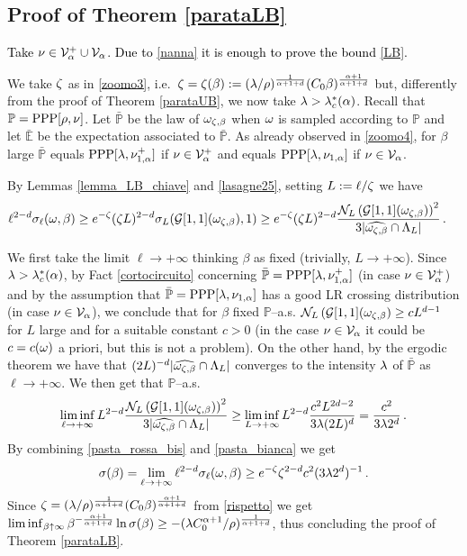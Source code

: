 \documentclass[12pt,a4paper,reqno]{amsart}
\newcommand{\cG}{\ensuremath{\mathcal G}}
\newcommand{\cN}{\ensuremath{\mathcal N}}
\newcommand{\cV}{\ensuremath{\mathcal V}}
\newcommand{\bbE}{{\ensuremath{\mathbb E}} }
\newcommand{\bbP}{{\ensuremath{\mathbb P}} }
\let\a=\alpha \let\b=\beta   \let\d=\delta  \let\e=\varepsilon
\newcommand{\rosso}{\textcolor{black}} %
\newcommand{\be}{\begin{equation}}
\newcommand{\en}{\end{equation}}
\newcommand{\cv}{\rosso{\cV_\alpha}}
\newcommand{\cvp}{\rosso{\cV^+_\alpha}}
\begin{document}
\subsection{Proof of Theorem \ref{parataLB}} \rosso{Take $\nu \in \cvp\cup \cv$.
 Due to \eqref{nanna} it is enough to prove the bound \eqref{LB}.}
 
We take $\zeta$ as in \eqref{zoomo3}, i.e.~$\z=\z(\b):=(\l /\rho)^{\frac{1}{\a+1+d}}(C_0 \b) ^{\frac{\a+1}{\a+1+d}}$ but, differently from the proof of Theorem \ref{parataUB}, we now take $\l>\l_c^*(\a)$. Recall that $\bbP={\rm PPP}[\rho, \nu]$.
 Let $\bar\bbP$ be   the law of $\o_{\z,\b}$ when $\omega$ is sampled according to $\bbP$ and let  $\bar \bbE$ be the expectation associated to $\bar \bbP$.
As already observed in \eqref{zoomo4},  for $\b$ large
  $\bar \bbP$ equals
$ {\rm PPP}[\l   ,\nu_{1,\a}^+]  $ if $ \nu\in \cvp$ and equals ${\rm PPP}[\l   ,\nu_{1,\a}]  $ if $ \nu \in \cv$.


 By Lemmas  \ref{lemma_LB_chiave}  and  \ref{lasagne25}, setting  $ L:= \ell/\zeta$ we have 
 \be\label{pasta_rossa_bis}
 \begin{split}
\ell^{2-d}\s_\ell(\o, \b)& \geq  e^{-\z } (\z L) ^{2-d}  \s_{L} ( \cG[1,1](\o_{\z,\b}  ),1)
\geq  e^{-\z }(\z L) ^{2-d} \frac{\cN_L\left( \cG[1,1](\o_{\z ,\b}  )\right)^2}{ 3 | \widehat{\o_{\z  ,\b} } \cap \L_L|}\,.
\end{split}
\en



We first take the limit $\ell \to +\infty$ thinking $\b$ as fixed (trivially, $L\to +\infty$).  Since $\l>\l_c^*(\a)$, by Fact \ref{cortocircuito} concerning $\bar \bbP={\rm PPP}[\l   ,\nu^+_{1,\a}]  $  (in case $\nu\in \cvp$) and by the assumption that $\bar \bbP={\rm PPP}[\l   ,\nu_{1,\a}]  $ has a good LR crossing distribution (in case $\nu\in \cv$), we conclude that for $\b$ fixed  $\bbP$--a.s.
$\cN_L\left( \cG[1,1](\o_{\z ,\b}  \right) \geq c L^{d-1}$ for $L$ large and for a suitable constant $c>0$ (in the case $\nu\in \cv$ it could be $c=c(\omega)$ a priori, but this is not a problem). On the other hand, by the ergodic theorem we have that $(2L)^{-d} | \widehat{\o_{\z ,\b} } \cap \L_L|$ converges to the intensity $\lambda$ of $\bar \bbP$   as $\ell \to +\infty$.
We then get that $\bbP$--a.s. 
\be\label{pasta_bianca}
\liminf_{\ell\to +\infty} L ^{2-d} \frac{\cN_L\left( \cG[1,1](\o_{\z ,\b}  )\right)^2}{ 3 | \widehat{\o_{\z ,\b} } \cap \L_L|}\geq \liminf_{L\to +\infty} L ^{2-d} \frac{c^2 L^{2d-2}}{ 3 \l  (2L)^d }=\frac{c^2}{3 \l 2^d}\,.
\en
By combining \eqref{pasta_rossa_bis} and \eqref{pasta_bianca} we get 
\be\label{rispetto}
\s(\b)=\lim_{\ell\to +\infty}\ell^{2-d}\s_\ell(\o, \b) \geq e^{-\z  } \z ^{2-d}  c^2 (3 \l 2^d)^{-1}\,.
\en
Since $\z=(\l /\rho)^{\frac{1}{\a+1+d}}(C_0 \b) ^{\frac{\a+1}{\a+1+d}}$
from \eqref{rispetto} we get 
$
\liminf _{\b \uparrow \infty}  \b^{-\frac{\a+1}{\a+1+d}} \ln \s(\b)  \geq -(\l  C_0^{\a+1}/\rho)^{\frac{1}{\a+1+d}}$, thus concluding the proof of Theorem \ref{parataLB}.
\end{document}
